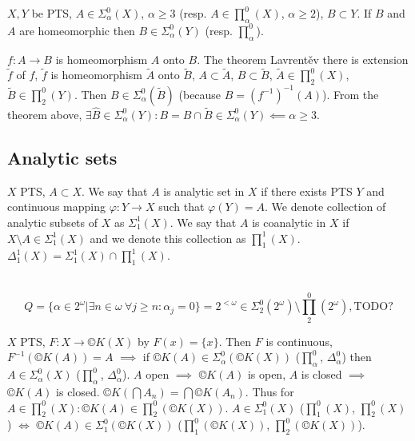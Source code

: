 \documentclass[12pt]{article}					%
\begin{document}
\begin{veta}
	$X, Y$ be PTS, $A \in Σ_α^0(X)$, $α ≥ 3$ (resp. $A \in ∏_α^0(X)$, $α ≥ 2$), $B \subset Y$. If $B$ and $A$ are homeomorphic then $B \in Σ_α^0(Y)$ (resp. $∏_α^0$).

	\begin{dukazin}
		$f: A \rightarrow B$ is homeomorphism $A$ onto $B$. The theorem Lavrentěv there is extension $\tilde f$ of $f$, $\tilde f$ is homeomorphism $\tilde A$ onto $\tilde B$, $A \subset \tilde A$, $B \subset \tilde B$, $\tilde A \in ∏_2^0(X)$, $\tilde B \in ∏_2^0(Y)$. Then $B \in Σ_α^0(\tilde B)$ (because $B = (f^{-1})^{-1}(A)$). From the theorem above, $\exists \hat{B} \in Σ_α^0(Y): B = \hat{B} \cap \tilde B \in Σ_α^0(Y) \impliedby α ≥ 3$.
	\end{dukazin}
\end{veta}

\subsection{Analytic sets}
\begin{definice}
	$X$ PTS, $A \subset X$. We say that $A$ is analytic set in $X$ if there exists PTS $Y$ and continuous mapping $φ: Y \rightarrow X$ such that $φ(Y) = A$. We denote collection of analytic subsets of $X$ as $Σ_1^1(X)$. We say that $A$ is coanalytic in $X$ if $X \setminus A \in Σ_1^1(X)$ and we denote this collection as $∏_1^1(X)$. $Δ_1^1(X) = Σ_1^1(X) \cap ∏_1^1(X)$.
\end{definice}

\begin{priklady}
	\ 
	\vspace{-2.5em}
	$$ Q = \{α \in 2^ω | \exists n \in ω\ \forall j ≥ n: α_j = 0\} = 2^{<ω} \in Σ_2^0(2^ω) \setminus ∏_2^0(2^ω), \text{TODO?} $$
\end{priklady}

\begin{poznamka}
	$X$ PTS, $F: X \rightarrow ©K(X)$ by $F(x) = \{x\}$. Then $F$ is continuous, $F^{-1}(©K(A)) = A$ $\implies$ if $©K(A) \in Σ_α^0 (©K(X))$ ($∏_α^0$, $Δ_α^0$) then $A \in Σ_α^0(X)$ ($∏_α^0$, $Δ_α^0$). $A$ open $\implies$ $©K(A)$ is open, $A$ is closed $\implies$ $©K(A)$ is closed. $©K(\bigcap A_n) = \bigcap ©K(A_n)$. Thus for $A \in ∏_2^0(X) : ©K(A) \in ∏_2^0(©K(X))$. $A \in Σ_1^0(X)$ ($∏_1^0(X)$, $∏_2^0(X)$) $\Leftrightarrow$ $©K(A) \in Σ_1^0(©K(X))$ ($∏_1^0(©K(X))$, $∏_2^0(©K(X))$).
\end{poznamka}
\end{document}
